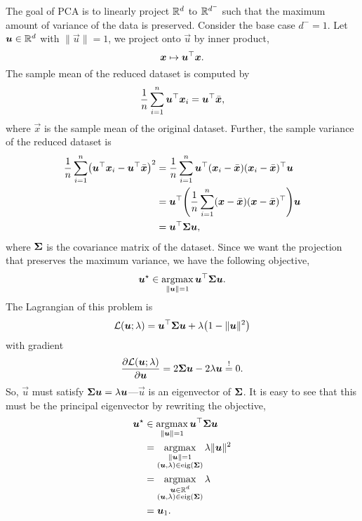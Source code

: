The goal of PCA is to linearly project $\mathbb{R}^d$ to $\mathbb{R}^{d^-}$ such that the maximum amount of
variance of the data is preserved.
Consider the base case $d^- = 1$. Let $\bm{u} \in \mathbb{R}^d$ with $\| \vec{u} \| = 1$, we project onto
$\vec{u}$ by inner product, \[
    \bm{x} \mapsto \bm{u}^\top \bm{x}.
\]
The sample mean of the reduced dataset is computed by \[
    \frac{1}{n} \sum_{i=1}^{n} \bm{u}^\top \bm{x}_i = \bm{u}^\top \bar{\bm{x}},
\]
where $\vec{x}$ is the sample mean of the original dataset. Further, the sample variance of the
reduced dataset is
\begin{align*}
    \frac{1}{n} \sum_{i=1}^{n} \lft( \transpose{\vec{u}} \vec{x}_i - \transpose{\vec{u}} \bar{\vec{x}} \rgt)^2 & = \frac{1}{n} \sum_{i=1}^{n} \transpose{\vec{u}} (\vec{x}_i - \bar{\vec{x}}) \transpose{(\vec{x}_i - \bar{\vec{x}})} \vec{u}         \\
                                                                                                               & = \transpose{\vec{u}} \lft( \frac{1}{n} \sum_{i=1}^{n} (\vec{x} - \bar{\vec{x}}) \transpose{(\vec{x} - \bar{\vec{x}})} \rgt) \vec{u} \\
                                                                                                               & = \transpose{\vec{u}} \mat{\Sigma} \vec{u},
\end{align*}
where $\bm{\Sigma}$ is the covariance matrix of the dataset. Since we want the projection that preserves the maximum variance, we have the following objective, \[
    \bm{u}^\star \in \operatorname*{argmax}_{\| \bm{u} \| = 1} \bm{u}^\top \bm{\Sigma} \bm{u}.
\]
The Lagrangian of this problem is \[
    \mathcal{L}(\vec{u}; \lambda) = \transpose{\vec{u}} \mat{\Sigma} \vec{u} + \lambda \lft( 1 - \| \vec{u} \|^2 \rgt)
\]
with gradient \[
    \pdv{\mathcal{L}(\bm{u}; \lambda)}{\bm{u}} = 2 \bm{\Sigma} \bm{u} - 2 \lambda \bm{u} \overset{!}{=} 0.
\]
So, $\vec{u}$ must satisfy $\bm{\Sigma} \bm{u} = \lambda \bm{u}$---$\vec{u}$ is an eigenvector
of $\bm{\Sigma}$. It is easy to see that this must be the principal eigenvector by rewriting the
objective,
\begin{align*}
    \bm{u}^\star & \in \operatorname*{argmax}_{\| \bm{u} \| = 1} \bm{u}^\top \bm{\Sigma} \bm{u} \\
                  & = \operatorname*{argmax}_{\substack{\| \bm{u} \| = 1                                   \\ (\bm{u}, \lambda) \in \mathrm{eig}(\bm{\Sigma})}} \lambda \| \bm{u} \|^2                    \\
                  & = \operatorname*{argmax}_{\substack{\bm{u} \in \mathbb{R}^d                                    \\ (\bm{u}, \lambda) \in \mathrm{eig}(\bm{\Sigma})}} \lambda                                    \\
                  & = \bm{u}_1.
\end{align*}
